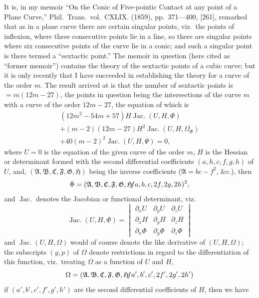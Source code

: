 \documentclass[12pt,a4paper]{article}
\theoremstyle{definition}
\DeclareMathOperator{\Jac}{Jac.}
\begin{document}
It is, in my memoir ``On the Conic of Five-pointic Contact at any point of a Plane Curve,'' Phil.\ Trans.\ vol.~CXLIX. (1859), pp.~371---400, [261], remarked that as in a plane curve there are certain singular points, viz.\ the points of inflexion, where three consecutive points lie in a line, so there are singular points where six consecutive points of the curve lie in a conic; and such a singular point is there termed a ``sextactic point.'' The memoir in question (here cited as ``former memoir'') contains the theory of the sextactic points of a cubic curve; but it is only recently that I have succeeded in establishing the theory for a curve of the order $m$. The result arrived at is that the number of sextactic points is $= m(12m - 27)$, the points in question being the intersections of the curve $m$ with a curve of the order $12m - 27$, the equation of which is
\begin{multline*}
(12m^2 - 54m + 57)H \Jac(U, H, \Phi) \\
+ (m - 2)(12m - 27)H^2 \Jac(U, H, \Omega_\Phi) \\
+ 40(m - 2)^2 \Jac(U, H, \Psi) = 0,
\end{multline*}
where $U = 0$ is the equation of the given curve of the order $m$, $H$ is the Hessian or determinant formed with the second differential coefficients $(a, h, c, f, g, h)$ of $U$, and, $(\mathfrak{A}, \mathfrak{B}, \mathfrak{C}, \mathfrak{F}, \mathfrak{G}, \mathfrak{H})$ being the inverse coefficients ($\mathfrak{A} = bc - f^2$, \&c.), then
\[
\Phi = (\mathfrak{A}, \mathfrak{B}, \mathfrak{C}, \mathfrak{F}, \mathfrak{G}, \mathfrak{H} \hspace{-2pt} fa, b, c, 2f, 2g, 2h)^2,
\]
and $\Jac$ denotes the Jacobian or functional determinant, viz.
\[
\Jac(U, H, \Phi) = \begin{vmatrix}
\partial_x U & \partial_y U & \partial_z U \\
\partial_x H & \partial_y H & \partial_z H \\
\partial_x \Phi & \partial_y \Phi & \partial_z \Phi
\end{vmatrix}
\]
and $\Jac(U, H, \Omega)$ would of course denote the like derivative of $(U, H, \Omega)$; the subscripts $(g, p)$ of $\Omega$ denote restrictions in regard to the differentiation of this function, viz.\ treating $\Omega$ as a function of $U$ and $H$,
\[
\Omega = (\mathfrak{A}, \mathfrak{B}, \mathfrak{C}, \mathfrak{F}, \mathfrak{G}, \mathfrak{H} \hspace{-2pt} fa', b', c', 2f', 2g', 2h')
\]
if $(a', b', c', f', g', h')$ are the second differential coefficients of $H$, then we have
\end{document}
